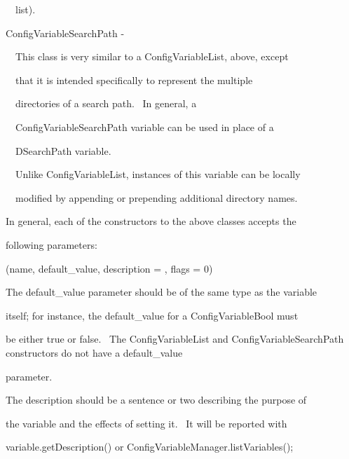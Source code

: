 \documentclass[a4paper]{article}
\begin{document}
{\color{black}
\ \ list).}


\bigskip

{\color{black}
ConfigVariableSearchPath -}


\bigskip

{\color{black}
\ \ This class is very similar to a ConfigVariableList, above, except}

{\color{black}
\ \ that it is intended specifically to represent the multiple}

{\color{black}
\ \ directories of a search path. \ In general, a}

{\color{black}
\ \ ConfigVariableSearchPath variable can be used in place of a}

{\color{black}
\ \ DSearchPath variable.}


\bigskip

{\color{black}
\ \ Unlike ConfigVariableList, instances of this variable can be locally}

{\color{black}
\ \ modified by appending or prepending additional directory names.}


\bigskip


\bigskip

{\color{black}
In general, each of the constructors to the above classes accepts the}

{\color{black}
following parameters:}


\bigskip

{\color{black}
(name, default\_value, description = {\textquotedbl}{\textquotedbl}, flags = 0)}


\bigskip

{\color{black}
The default\_value parameter should be of the same type as the variable}

{\color{black}
itself; for instance, the default\_value for a ConfigVariableBool must}

\clearpage
\bigskip

{\color{black}
be either true or false. \ The ConfigVariableList and ConfigVariableSearchPath constructors do not have a
default\_value}

{\color{black}
parameter.}


\bigskip

{\color{black}
The description should be a sentence or two describing the purpose of}

{\color{black}
the variable and the effects of setting it. \ It will be reported with}

{\color{black}
variable.getDescription() or ConfigVariableManager.listVariables();}
\end{document}
